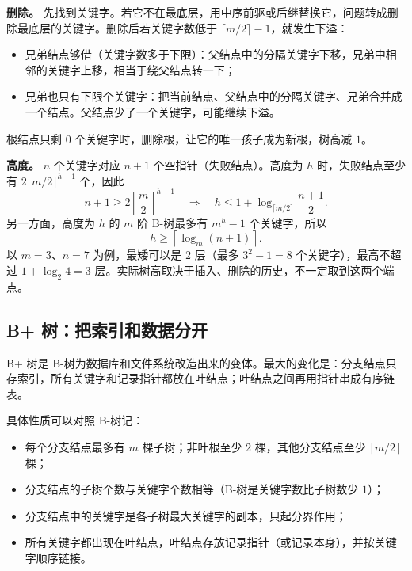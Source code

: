 \textbf{删除。} 先找到关键字。若它不在最底层，用中序前驱或后继替换它，问题转成删除最底层的关键字。删除后若关键字数低于 $\lceil m/2\rceil-1$，就发生下溢：
\begin{itemize}
  \item 兄弟结点够借（关键字数多于下限）：父结点中的分隔关键字下移，兄弟中相邻的关键字上移，相当于绕父结点转一下；
  \item 兄弟也只有下限个关键字：把当前结点、父结点中的分隔关键字、兄弟合并成一个结点。父结点少了一个关键字，可能继续下溢。
\end{itemize}
根结点只剩 $0$ 个关键字时，删除根，让它的唯一孩子成为新根，树高减 $1$。

\textbf{高度。} $n$ 个关键字对应 $n+1$ 个空指针（失败结点）。高度为 $h$ 时，失败结点至少有 $2\lceil m/2\rceil^{h-1}$ 个，因此
\[
n+1\ge 2\left\lceil\frac{m}{2}\right\rceil^{h-1}
\quad\Longrightarrow\quad
h\le 1+\log_{\lceil m/2\rceil}\frac{n+1}{2}.
\]
另一方面，高度为 $h$ 的 $m$ 阶 B-树最多有 $m^h-1$ 个关键字，所以
\[
h\ge \left\lceil\log_m(n+1)\right\rceil.
\]
以 $m=3$、$n=7$ 为例，最矮可以是 $2$ 层（最多 $3^2-1=8$ 个关键字），最高不超过 $1+\log_2 4=3$ 层。实际树高取决于插入、删除的历史，不一定取到这两个端点。

\subsection{B+ 树：把索引和数据分开}

B+ 树是 B-树为数据库和文件系统改造出来的变体。最大的变化是：分支结点只存索引，所有关键字和记录指针都放在叶结点；叶结点之间再用指针串成有序链表。

具体性质可以对照 B-树记：
\begin{itemize}
  \item 每个分支结点最多有 $m$ 棵子树；非叶根至少 $2$ 棵，其他分支结点至少 $\lceil m/2\rceil$ 棵；
  \item 分支结点的子树个数与关键字个数相等（B-树是关键字数比子树数少 $1$）；
  \item 分支结点中的关键字是各子树最大关键字的副本，只起分界作用；
  \item 所有关键字都出现在叶结点，叶结点存放记录指针（或记录本身），并按关键字顺序链接。
\end{itemize}

